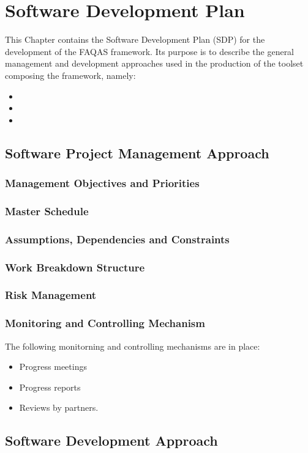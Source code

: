 \chapter{Software Development Plan}
\label{chapter:software_development}
This Chapter contains the Software Development Plan (SDP) for the development of the FAQAS framework. Its purpose is to describe the general management and development approaches used in the production of the toolset composing the framework, namely:
\begin{itemize}
  \item \MASS
  \item \DAMA
  \item \SEMUS
\end{itemize}

\section{Software Project Management Approach}

\subsection{Management Objectives and Priorities}

\subsection{Master Schedule}

\subsection{Assumptions, Dependencies and Constraints}

\subsection{Work Breakdown Structure}

\subsection{Risk Management}

\subsection{Monitoring and Controlling Mechanism}

The following monitorning and controlling mechanisms are in place:
\begin{itemize}
  \item Progress meetings
  \item Progress reports
  \item Reviews by partners.
\end{itemize}

\section{Software Development Approach}
